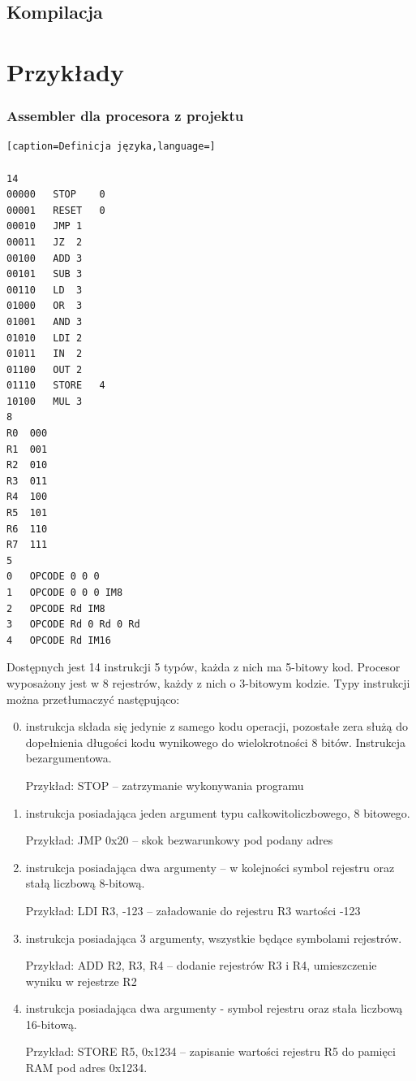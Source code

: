 \documentclass[a4paper,12pt]{report}
\begin{document}
\subsection{Kompilacja}

\section{Przykłady}

\label{sec:asmex}
\subsubsection{Assembler dla procesora z projektu}
\lstset{
tabsize=6
}\begin{lstlisting}[caption=Definicja języka,language=]

14
00000	STOP	0
00001	RESET	0
00010	JMP	1
00011	JZ	2
00100	ADD	3
00101	SUB	3
00110	LD	3
01000	OR	3
01001	AND	3
01010	LDI	2
01011	IN	2
01100	OUT	2
01110	STORE	4
10100	MUL	3
8
R0	000
R1	001
R2	010
R3	011
R4	100
R5	101
R6	110
R7	111
5
0	OPCODE 0 0 0
1	OPCODE 0 0 0 IM8
2	OPCODE Rd IM8
3	OPCODE Rd 0 Rd 0 Rd
4	OPCODE Rd IM16
\end{lstlisting}

Dostępnych jest 14 instrukcji 5 typów, każda z nich ma 5-bitowy kod. Procesor wyposażony jest w 8 rejestrów, każdy z nich o 3-bitowym kodzie. Typy instrukcji można przetłumaczyć następująco:
\begin{enumerate}
\setcounter{enumi}{-1}
  \item instrukcja składa się jedynie z samego kodu operacji, pozostałe zera służą do dopełnienia długości kodu wynikowego do wielokrotności 8 bitów. Instrukcja bezargumentowa.

  Przykład: STOP -- zatrzymanie wykonywania programu
  \item instrukcja posiadająca jeden argument typu całkowitoliczbowego, 8 bitowego. 

  Przykład: JMP 0x20 -- skok bezwarunkowy pod podany adres
  \item instrukcja posiadająca dwa argumenty -- w kolejności symbol rejestru oraz stałą liczbową 8-bitową.
  
  Przykład: LDI R3, -123 -- załadowanie do rejestru R3 wartości -123
  \item instrukcja posiadająca 3 argumenty, wszystkie będące symbolami rejestrów.

  Przykład: ADD R2, R3, R4 -- dodanie rejestrów R3 i R4, umieszczenie wyniku w rejestrze R2
  \item instrukcja posiadająca dwa argumenty - symbol rejestru oraz stała liczbową 16-bitową.

  Przykład: STORE R5, 0x1234 -- zapisanie wartości rejestru R5 do pamięci RAM pod adres 0x1234.
\end{enumerate}
\end{document}
